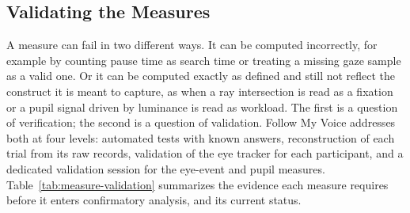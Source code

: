 \subsection{Validating the Measures}
\label{sec:measure-validation}
A measure can fail in two different ways. It can be computed incorrectly, for example by counting pause time as search time or treating a missing gaze sample as a valid one. Or it can be computed exactly as defined and still not reflect the construct it is meant to capture, as when a ray intersection is read as a fixation or a pupil signal driven by luminance is read as workload. The first is a question of verification; the second is a question of validation. Follow My Voice addresses both at four levels: automated tests with known answers, reconstruction of each trial from its raw records, validation of the eye tracker for each participant, and a dedicated validation session for the eye-event and pupil measures. Table~\ref{tab:measure-validation} summarizes the evidence each measure requires before it enters confirmatory analysis, and its current status.

